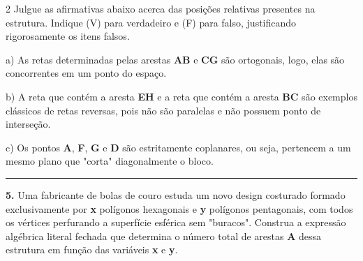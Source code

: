 \documentclass[twoside, 10pt, a4paper]{article}
\begin{document}
\begin{multicols*}{2}
Julgue as afirmativas abaixo acerca das posições relativas presentes na estrutura. Indique (V) para verdadeiro e (F) para falso, justificando rigorosamente os itens falsos.

a) As retas determinadas pelas arestas \textbf{AB} e \textbf{CG} são ortogonais, logo, elas são concorrentes em um ponto do espaço.\par\par\vspace{0.5cm}
b) A reta que contém a aresta \textbf{EH} e a reta que contém a aresta \textbf{BC} são exemplos clássicos de retas reversas, pois não são paralelas e não possuem ponto de interseção.\par\par\vspace{0.5cm}
c) Os pontos \textbf{A}, \textbf{F}, \textbf{G} e \textbf{D} são estritamente coplanares, ou seja, pertencem a um mesmo plano que "corta" diagonalmente o bloco.

\par\vspace{0.5cm}
\noindent\textcolor{CorLinha}{\rule{\linewidth}{0.5pt}} 
\par\par\vspace{0.5cm}
\textbf{5.} Uma fabricante de bolas de couro estuda um novo design costurado formado exclusivamente por \textbf{x} polígonos hexagonais e \textbf{y} polígonos pentagonais, com todos os vértices perfurando a superfície esférica sem "buracos". Construa a expressão algébrica literal fechada que determina o número total de arestas \textbf{A} dessa estrutura em função das variáveis \textbf{x} e \textbf{y}.


\end{multicols*}
\end{document}
